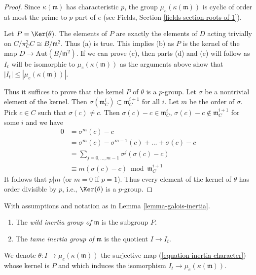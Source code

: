 \begin{proof}
\medskip\noindent
Since $\kappa(\mathfrak m)$ has characteristic $p$, the group
$\mu_e(\kappa(\mathfrak m))$ is cyclic of order at most the prime
to $p$ part of $e$ (see Fields, Section \ref{fields-section-roots-of-1}).

\medskip\noindent
Let $P = \Ker(\theta)$. The elements of $P$ are exactly the elements
of $D$ acting trivially on $C/\pi_C^2C \cong B/\mathfrak m^2$.
Thus (a) is true. This implies (b) as $P$ is the kernel
of the map $D \to \text{Aut}(B/\mathfrak m^2)$.
If we can prove (c), then parts (d) and (e) will follow as $I_t$
will be isomorphic to $\mu_e(\kappa(\mathfrak m))$ as the arguments above show
that $|I_t| \leq |\mu_e(\kappa(\mathfrak m))|$.

\medskip\noindent
Thus it suffices to prove that the
kernel $P$ of $\theta$ is a $p$-group. Let $\sigma$ be a nontrivial element of
the kernel. Then $\sigma(\mathfrak m_C^i) \subset \mathfrak m_C^{i + 1}$
for all $i$. Let $m$ be the order of $\sigma$. Pick $c \in C$ such
that $\sigma(c) \not = c$. Then $\sigma(c) - c \in \mathfrak m_C^i$,
$\sigma(c) - c \not \in \mathfrak m_C^{i + 1}$ for some $i$ and
we have
\begin{align*}
0
& =
\sigma^m(c) - c \\
& =
\sigma^m(c) - \sigma^{m - 1}(c) + \ldots + \sigma(c) - c \\
& =
\sum\nolimits_{j = 0, \ldots, m - 1} \sigma^j(\sigma(c) - c) \\
& \equiv
m(\sigma(c) - c) \bmod \mathfrak m_C^{i + 1}
\end{align*}
It follows that $p | m$ (or $m = 0$ if $p = 1$). Thus every element of the
kernel of $\theta$ has order divisible by $p$, i.e., $\Ker(\theta)$
is a $p$-group.
\end{proof}

\begin{definition}
\label{definition-wild-inertia}
With assumptions and notation as in Lemma \ref{lemma-galois-inertia}.
\begin{enumerate}
\item The {\it wild inertia group of $\mathfrak m$} is the subgroup $P$.
\item The {\it tame inertia group of $\mathfrak m$} is the
quotient $I \to I_t$.
\end{enumerate}
We denote $\theta : I \to \mu_e(\kappa(\mathfrak m))$ the surjective map
(\ref{equation-inertia-character}) whose kernel is $P$ and which
induces the isomorphism $I_t \to \mu_e(\kappa(\mathfrak m))$.
\end{definition}

